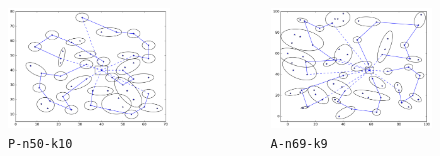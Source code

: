 \documentclass[11pt]{beamer}
\begin{document}
\begin{frame}
\begin{columns}[t,onlytextwidth]
\begin{figure}
\centering
\includegraphics[width=\linewidth]{Images/P-n50-k10-c30_flow_n50_k31_m5_Q200_TL150_optimum.png}
\caption{\texttt{P-n50-k10}}
\end{figure}

\begin{figure}
\centering
\includegraphics[width=\linewidth]{Images/A-n69-k9-c31_flow_n69_k32_m6_Q150_TL240_map.png}
\caption{\texttt{A-n69-k9}}
\end{figure}



\end{columns}
\end{frame}
\end{document}
